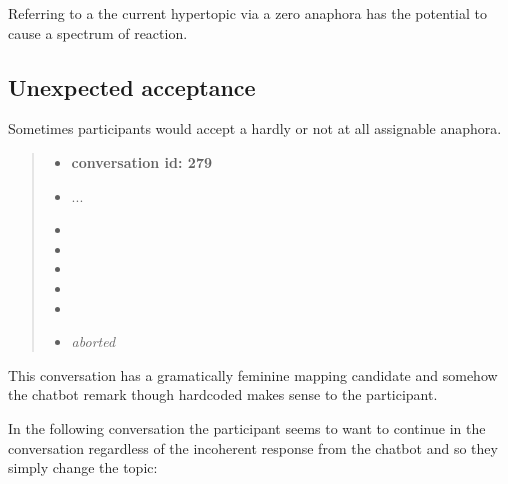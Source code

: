 Referring to a the current hypertopic via a zero anaphora has the potential to cause a spectrum of reaction.

\subsection{Unexpected acceptance}

Sometimes participants would accept a hardly or not at all assignable anaphora.

    \begin{quote}
    \begin{itemize}[label={}, leftmargin=0pt, itemsep=0.5em]
    \item \textbf{conversation id: 279}
    \item ...
    \item {}
    \item {}
    \item {}
    \item {}
    \item {}
    \item \textit{aborted}
    \end{itemize}
    \end{quote}

This conversation has a gramatically feminine mapping candidate
and somehow the chatbot remark though hardcoded makes sense to the participant.

In the following conversation the participant seems to want to continue in the conversation
regardless of the incoherent response from the chatbot and so they simply change the topic:

